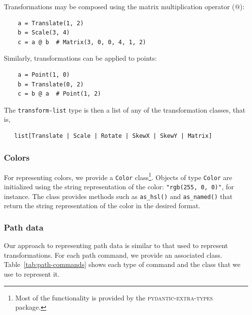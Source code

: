 Transformations may be composed using the matrix multiplication operator (@):
\begin{verbatim}
    a = Translate(1, 2)
    b = Scale(3, 4)
    c = a @ b  # Matrix(3, 0, 0, 4, 1, 2)
\end{verbatim}
Similarly, transformations can be applied to points:
\begin{verbatim}
    a = Point(1, 0)
    b = Translate(0, 2)
    c = b @ a  # Point(1, 2)
\end{verbatim}

The \texttt{transform-list} type is then a list of any of the transformation classes, that is, 
\begin{verbatim}
   list[Translate | Scale | Rotate | SkewX | SkewY | Matrix] 
\end{verbatim}

\subsubsection{Colors}

For representing colors, we provide a \texttt{Color} class\footnote{Most of the functionality is provided by the \textsc{pydantic-extra-types}~\cite{pydantic-extra-types} package.}. Objects of type \texttt{Color} are initialized using the string representation of the color: \texttt{"rgb(255, 0, 0)"}, for instance. The class provides methods such as \texttt{as\_hsl()} and \texttt{as\_named()} that return the string representation of the color in the desired format.

\subsubsection{Path data}

Our approach to representing path data is similar to that used to represent transformations. For each path command, we provide an associated class. Table~\ref{tab:path-commands} shows each type of command and the class that we use to represent it.

